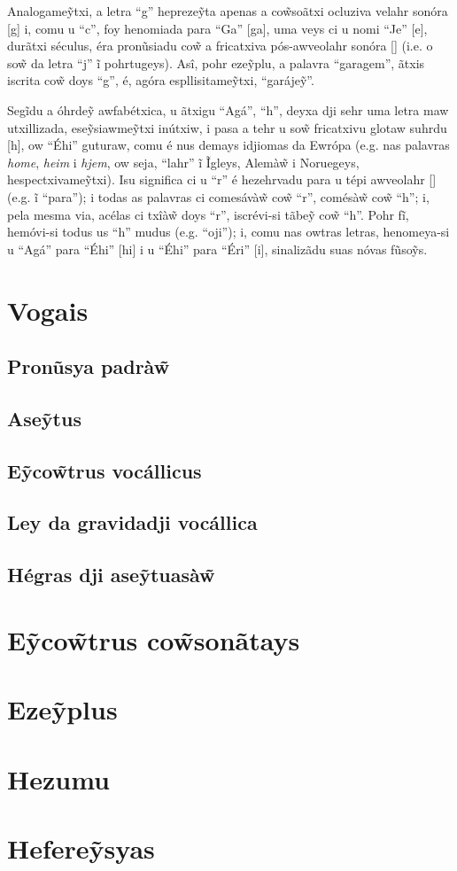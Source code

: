 \documentclass[12pt, a5paper, titlepage]{article}
\begin{document}
\begin{bilingualpages}
    Analogame\~ytxi, a letra ``g'' hepreze\~yta apenas a co\~wsoãtxi ocluziva velahr sonóra [g] i, comu u ``c'', foy henomiada para ``Ga'' [ga], uma veys ci u nomi ``Je'' [\textyogh e], durãtxi séculus, éra pronũsiadu co\~w a fricatxiva pós-awveolahr sonóra [\textyogh] (i.e. o so\~w da letra ``j'' ĩ pohrtugeys). Asî, pohr eze\~yplu, a palavra ``garagem'', ãtxis iscrita co\~w doys ``g'', é, agóra espllisitame\~ytxi, ``garáje\~y''.

    Segĩdu a óhrde\~y awfabétxica, u ãtxigu ``Agá'', ``h'', deyxa dji sehr uma letra maw utxillizada, ese\~ysiawme\~ytxi inútxiw, i pasa a tehr u so\~w fricatxivu glotaw suhrdu [h], ow ``Éhi'' guturaw, comu é nus demays idjiomas da Ewrópa (e.g. nas palavras \textit{home}, \textit{heim} i \textit{hjem}, ow seja, ``lahr'' ĩ Ĩgleys, Alemà\~w i Noruegeys, hespectxivame\~ytxi). Isu significa ci u ``r'' é hezehrvadu para u tépi awveolahr [\textfishhookr] (e.g. ĩ ``para''); i todas as palavras ci comesávà\~w co\~w ``r'', comésà\~w co\~w ``h''; i, pela mesma via, acélas ci txîà\~w doys ``r'', iscrévi-si tãbe\~y co\~w ``h''. Pohr fĩ, hemóvi-si todus us ``h'' mudus (e.g. ``oji''); i, comu nas owtras letras, henomeya-si u ``Agá'' para ``Éhi'' [\textepsilon hi] i u ``Éhi'' para ``Éri'' [\textepsilon \textfishhookr i], sinalizãdu suas nóvas fũso\~ys.

    \section{Vogais}
    \subsection{Pronũsya padrà\~w}
    \subsection{Ase\~ytus}
    \subsection{E\~yco\~wtrus vocállicus}
    \subsection{Ley da gravidadji vocállica}
    \subsection{Hégras dji ase\~ytuasà\~w}

    \section{E\~yco\~wtrus co\~wsonãtays}

    \section{Eze\~yplus}
    
\end{bilingualpages}

\newpage
\section{Hezumu}

\newpage
\section{Hefere\~ysyas}
\end{document}

